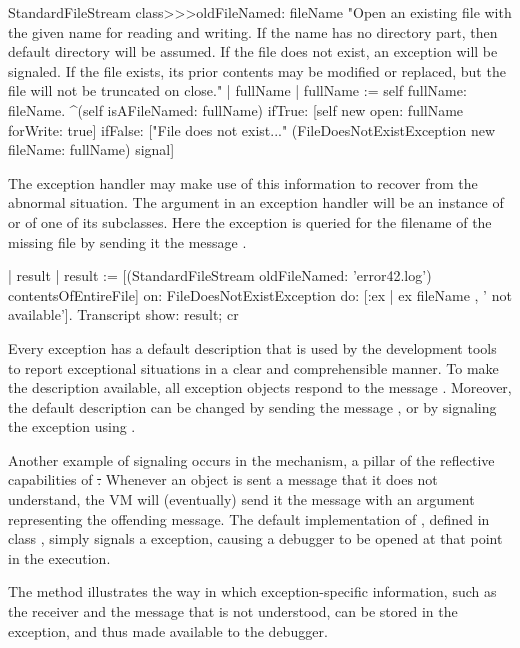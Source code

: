\documentclass[a4paper,10pt,twoside]{book}
\begin{document}
\begin{code}{}
StandardFileStream class>>>oldFileNamed: fileName
	"Open an existing file with the given name for reading and writing. If the name has no directory part, then default directory will be assumed. If the file does not exist, an exception will be signaled. If the file exists, its prior contents may be modified or replaced, but the file will not be truncated on close."
	| fullName |
	fullName := self fullName: fileName.
	^(self isAFileNamed: fullName)
		ifTrue: [self new open: fullName forWrite: true]
		ifFalse: ["File does not exist..."
			(FileDoesNotExistException new fileName: fullName) signal]
\end{code}

The exception handler may make use of this information to recover from the abnormal situation. The argument  in an exception handler \ct{[:ex | ...]} will be an instance of  or of one of its subclasses. Here the exception is queried for the filename of the missing file by sending it the message .

\begin{code}{}
| result |
result := [(StandardFileStream oldFileNamed: 'error42.log') contentsOfEntireFile]
	on: FileDoesNotExistException
	do: [:ex | ex fileName , ' not available'].
Transcript show: result; cr
\end{code}

Every exception has a default description that is used by the development tools to report exceptional situations in a clear and comprehensible manner. To make the description available, all exception objects respond to the message . Moreover, the default description can be changed by sending the message , or by signaling the exception using .

Another example of signaling occurs in the  mechanism, a pillar of the reflective capabilities of \st. Whenever an object is sent a message that it does not understand, the VM will (eventually) send it the message  with an argument representing the offending message. The default implementation of , defined in class , simply signals a  exception, causing a debugger to be opened at that point in the execution.

The  method illustrates the way in which exception-specific information, such as the receiver and the message that is not understood, can be stored in the exception, and thus made available to the debugger.
\end{document}
